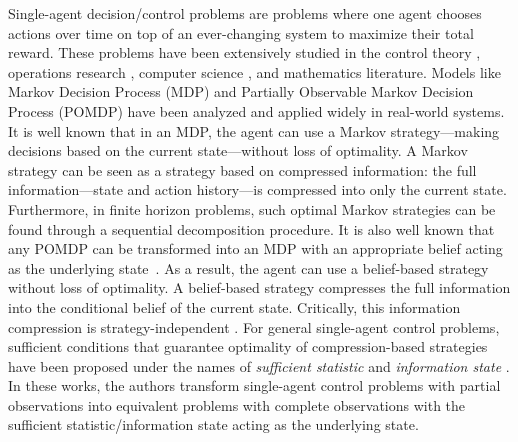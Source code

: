 \documentclass[pdflatex,sn-basic]{sn-jnl}
\theoremstyle{thmstyleone}%
\theoremstyle{thmstyletwo}%
\theoremstyle{thmstylethree}%
\begin{document}
Single-agent {decision/control} problems are problems where one agent chooses actions over time on top of an ever-changing system to maximize {their} total reward. These problems have been extensively studied in the control theory \citep{kumar1986stochastic}, operations research \citep{powell2007approximate}, computer science \citep{russell2002artificial}, and mathematics \citep{bellman1966dynamic} literature. Models like Markov Decision Process (MDP) and Partially Observable Markov Decision Process (POMDP) have been analyzed and applied widely in real-world systems. It is well known that in an MDP, the agent can use a Markov strategy---making decisions based on the current {state}---without loss of optimality. 
A Markov strategy can be seen as a strategy based on compressed information: the full {information---state and action history}---is compressed into only the current state. Furthermore, in finite horizon problems, such optimal Markov strategies can be found through a sequential decomposition procedure. It is also well known that any POMDP can be transformed into an MDP with an appropriate belief acting as the underlying state~\citep[Chapter 6]{kumar1986stochastic}. As a result, the agent can use a belief-based strategy without loss of optimality. A belief-based strategy compresses the full information into the conditional belief of the current state. Critically, this information compression is strategy-independent \citep{aastrom1965optimal,smallwood1973optimal,sondik1978optimal,kumar1986stochastic}.
For general single-agent control problems, sufficient conditions that guarantee optimality of compression-based strategies have been proposed under {the names} of \emph{sufficient statistic} \citep{shiryaev1964markov,striebel1965sufficient,whittle1969sequential,hinderer1970sufficient,striebel1975lecture} and \emph{information state} \citep{kumar1986stochastic,mahajan2016decentralized,subramanian2020approximate}. In these works, the authors transform single-agent control problems with partial observations into equivalent problems with complete observations with the sufficient statistic/information state acting as the underlying state.
\end{document}
